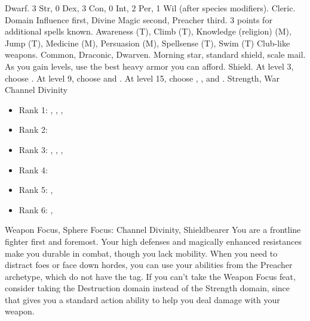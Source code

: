              Dwarf.
             3 Str, 0 Dex, 3 Con, 0 Int, 2 Per, 1 Wil (after species modifiers).
             Cleric.
             Domain Influence first, Divine Magic second, Preacher third.
             3 points for additional spells known.
             Awareness (T), Climb (T), Knowledge (religion) (M), Jump (T), Medicine (M), Persuasion (M), Spellsense (T), Swim (T)
             Club-like weapons.
             Common, Draconic, Dwarven.
             Morning star, standard shield, scale mail. As you gain levels, use the best heavy armor you can afford.
             Shield.
                At level 3, choose .
                At level 9, choose  and .
                At level 15, choose , , and .
             Strength, War
             Channel Divinity
            \begin{itemize}
                \item Rank 1: , , , 
                \item Rank 2: 
                \item Rank 3: , , , 
                \item Rank 4: 
                \item Rank 5: , 
                \item Rank 6: , 
            \end{itemize}
             Weapon Focus, Sphere Focus: Channel Divinity, Shieldbearer
             You are a frontline fighter first and foremost.
            Your high defenses and magically enhanced resistances make you durable in combat, though you lack mobility. 
            When you need to distract foes or face down hordes, you can use your abilities from the Preacher archetype, which do not have the  tag.
            If you can't take the Weapon Focus feat, consider taking the Destruction domain instead of the Strength domain, since that gives you a standard action ability to help you deal damage with your weapon.

